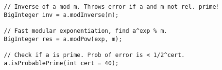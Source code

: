 \begin{verbatim}
// Inverse of a mod m. Throws error if a and m not rel. prime!
BigInteger inv = a.modInverse(m); 

// Fast modular exponentiation, find a^exp % m.
BigInteger res = a.modPow(exp, m);

// Check if a is prime. Prob of error is < 1/2^cert.
a.isProbablePrime(int cert = 40);
\end{verbatim}